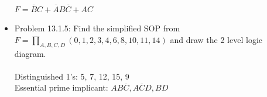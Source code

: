 \documentclass[10pt,a4paper]{article}
\newcommand{\ol}[1]{\overline{#1}}
\begin{document}
\begin{itemize}
\\
$F=\ol{B}C+\ol{A}B\ol{C}+AC$
\item Problem 13.1.5: Find the simplified SOP from $F=\prod_{A,B,C,D}(0,1,2,3,4,6,8,10,11,14)$ and draw the 2 level logic diagram.\\~\\
Distinguished 1's: 5, 7, 12, 15, 9\\
Essential prime implicant: $AB\ol{C}, A\ol{C}D, BD$\\
\end{itemize}\pagebreak
\end{document}
